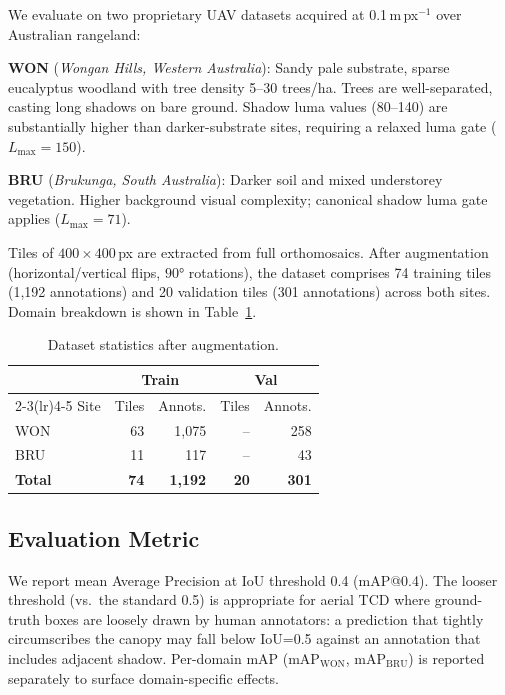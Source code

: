 \documentclass[10pt,twocolumn]{article}
\begin{document}
We evaluate on two proprietary UAV datasets acquired at 0.1\,m\,px$^{-1}$
over Australian rangeland:

\textbf{WON} (\emph{Wongan Hills, Western Australia}): Sandy pale substrate,
sparse eucalyptus woodland with tree density 5--30 trees/ha. Trees are
well-separated, casting long shadows on bare ground. Shadow luma values
(80--140) are substantially higher than darker-substrate sites, requiring
a relaxed luma gate ($L_{\max} = 150$).

\textbf{BRU} (\emph{Brukunga, South Australia}): Darker soil and mixed
understorey vegetation. Higher background visual complexity; canonical shadow
luma gate applies ($L_{\max} = 71$).

Tiles of $400 \times 400$\,px are extracted from full orthomosaics. After
augmentation (horizontal/vertical flips, $90°$ rotations), the dataset
comprises 74 training tiles (1,192 annotations) and 20 validation tiles
(301 annotations) across both sites. Domain breakdown is shown in
Table~\ref{tab:dataset}.

\begin{table}[h]
  \centering
  \caption{Dataset statistics after augmentation.}
  \label{tab:dataset}
  \small
  \begin{tabular}{lrrrr}
    \toprule
    & \multicolumn{2}{c}{Train} & \multicolumn{2}{c}{Val} \\
    \cmidrule(lr){2-3}\cmidrule(lr){4-5}
    Site & Tiles & Annots. & Tiles & Annots. \\
    \midrule
    WON & 63 & 1,075 & -- & 258 \\
    BRU &  11 &   117 & -- &  43 \\
    \textbf{Total} & \textbf{74} & \textbf{1,192} & \textbf{20} & \textbf{301} \\
    \bottomrule
  \end{tabular}
\end{table}

\subsection{Evaluation Metric}

We report mean Average Precision at IoU threshold 0.4 (mAP@0.4). The looser
threshold (vs.\ the standard 0.5) is appropriate for aerial TCD where
ground-truth boxes are loosely drawn by human annotators: a prediction that
tightly circumscribes the canopy may fall below IoU=0.5 against an
annotation that includes adjacent shadow. Per-domain mAP (mAP$_{\text{WON}}$,
mAP$_{\text{BRU}}$) is reported separately to surface domain-specific effects.
\end{document}
